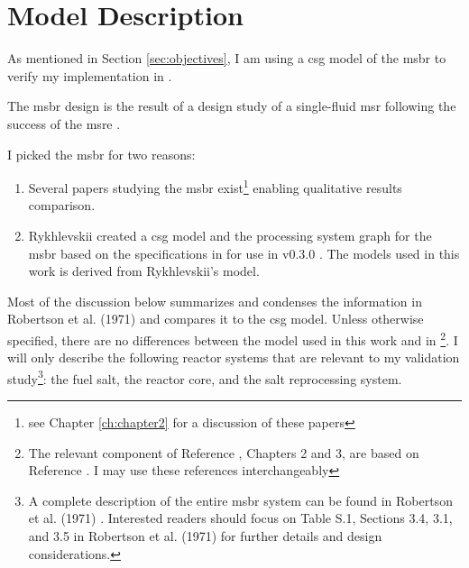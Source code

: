 \chapter{Model Description}
\label{ch:chapter4}
As mentioned in Section \ref{sec:objectives}, I am using a \Gls{csg} model of
the \Gls{msbr} \cite{robertson_conceptual_1971} to verify my \OpenMC
implementation in \SaltProc.

The \Gls{msbr} design is the result of a design study of a single-fluid
\Gls{msr} following the success of the \Gls{msre}
\cite{haubenreich_experience_1970} \cite{rosenthal_history_1970}.

I picked the \Gls{msbr} for two reasons:
\begin{enumerate}
    \item Several papers studying the \Gls{msbr} exist\footnote{see Chapter
    \ref{ch:chapter2} for a discussion of these papers} enabling qualitative
    results comparison.
    \item Rykhlevskii created a \SerpentTWO \Gls{csg} model and the processing
    system graph for the \Gls{msbr} based on the specifications in
    \cite{robertson_conceptual_1971} for use in \SaltProc
    v0.3.0 \cite{rykhlevskii_fuel_2020}. The models used in this work is derived
    from Rykhlevskii's model.
\end{enumerate}

Most of the discussion below summarizes and condenses the information in
Robertson et al. (1971) and compares it to the \Gls{csg} model. Unless otherwise
specified, there are no differences between the model used in this work and in
\cite{rykhlevskii_fuel_2020}\footnote{The relevant component of Reference
\cite{rykhlevskii_fuel_2020}, Chapters 2 and 3, are based on Reference
\cite{rykhlevskii_modeling_2019}. I may use these references interchangeably}. I
will only describe the following reactor systems that are relevant to my
validation study\footnote{A complete description of the entire \Gls{msbr} system
can be found in Robertson et al. (1971) \cite{robertson_conceptual_1971}.
Interested readers should focus on Table S.1, Sections 3.4, 3.1, and 3.5 in
Robertson et al. (1971) for further details and design considerations.}: the
fuel salt, the reactor core, and the salt reprocessing system.

